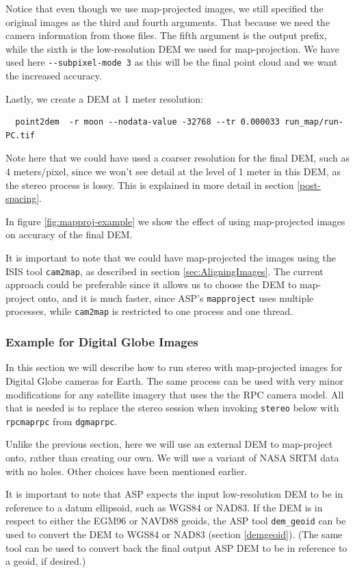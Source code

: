 Notice that even though we use map-projected images, we still specified
the original images as the third and fourth arguments. That because we
need the camera information from those files.  The fifth argument is
the output prefix, while the sixth is the low-resolution DEM we used for
map-projection. We have used here \texttt{-\/-subpixel-mode 3} as this
will be the final point cloud and we want the increased accuracy.

Lastly, we create a DEM at 1 meter resolution:
\begin{verbatim}
  point2dem  -r moon --nodata-value -32768 --tr 0.000033 run_map/run-PC.tif
\end{verbatim}
Note here that we could have used a coarser resolution for the final
DEM, such as 4 meters/pixel, since we won't see detail at the level of
1 meter in this DEM, as the stereo process is lossy. This is
explained in more detail in section \ref{post-spacing}.

In figure \ref{fig:mapproj-example} we show the effect of using
map-projected images on accuracy of the final DEM.

It is important to note that we could have map-projected the images
using the ISIS tool \texttt{cam2map}, as described in section
\ref{sec:AligningImages}. The current approach could be preferable since
it allows us to choose the DEM to map-project onto, and it is much faster,
since ASP's \texttt{mapproject} uses multiple processes, while \texttt{cam2map}
is restricted to one process and one thread.

\subsubsection{Example for Digital Globe Images}
\label{dg-mapproj}

In this section we will describe how to run stereo with map-projected
images for Digital Globe cameras for Earth. The same process can be used
with very minor modifications for any satellite imagery that uses the
the RPC camera model. All that is needed is to replace the stereo
session when invoking \texttt{stereo} below with \texttt{rpcmaprpc} from
\texttt{dgmaprpc}.

Unlike the previous section, here we will use an external DEM to map-project
onto, rather than creating our own. We will use a variant of NASA
SRTM data with no holes. Other choices have been mentioned earlier.

It is important to note that ASP expects the input low-resolution DEM to
be in reference to a datum ellipsoid, such as WGS84 or NAD83. If the DEM
is in respect to either the EGM96 or NAVD88 geoids, the ASP tool
\texttt{dem\_geoid} can be used to convert the DEM to WGS84 or NAD83
(section \ref{demgeoid}). (The same tool can be used to convert back the
final output ASP DEM to be in reference to a geoid, if desired.)

